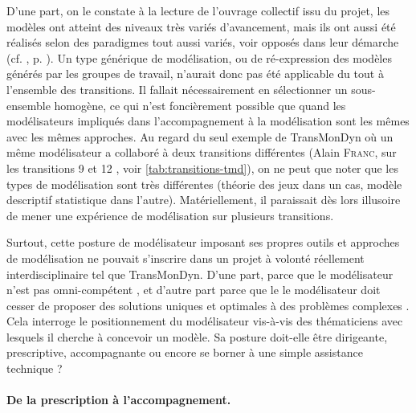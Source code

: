 D'une part, on le constate à la lecture de l'ouvrage collectif issu du projet, les modèles ont atteint des niveaux très variés d'avancement, mais ils ont aussi été réalisés selon des paradigmes tout aussi variés, voir opposés dans leur démarche (cf. , p. \pageref{par:interdisciplinarite-methodo}).
Un type générique de modélisation, ou de ré-expression des modèles générés par les groupes de travail, n'aurait donc pas été applicable du tout à l'ensemble des transitions.
Il fallait nécessairement en sélectionner un sous-ensemble homogène, ce qui n'est foncièrement possible que quand les modélisateurs impliqués dans l'accompagnement à la modélisation sont les mêmes avec les mêmes approches.
Au regard du seul exemple de TransMonDyn où un même modélisateur a collaboré à deux transitions différentes (Alain \textsc{Franc}, sur les transitions 9 \autocite{ouriachi_transition_2018} et 12 \autocite{bretagnolle_transition_2018}, voir \cref{tab:transitions-tmd}), on ne peut que noter que les types de modélisation sont très différentes (théorie des jeux dans un cas, modèle descriptif statistique dans l'autre).
Matériellement, il paraissait dès lors illusoire de mener une expérience de modélisation sur plusieurs transitions.

Surtout, cette posture de modélisateur \og imposant\fg{} ses propres outils et approches de modélisation ne pouvait s'inscrire dans un projet à volonté réellement interdisciplinaire tel que TransMonDyn.
D'une part, parce que \og le modélisateur n'est pas omni-compétent\fg{} \autocite[77]{banos_pour_2013}, et d'autre part parce que le \og le modélisateur doit cesser de proposer des solutions uniques et optimales à des problèmes complexes\fg{} \autocite[79]{banos_pour_2013}.
Cela interroge le positionnement du modélisateur vis-à-vis des thématiciens \og avec\fg{} lesquels il cherche à concevoir un modèle.
Sa posture doit-elle être dirigeante, prescriptive, accompagnante ou encore se borner à une simple assistance technique ?

\paragraph{De la prescription à l'accompagnement.}

